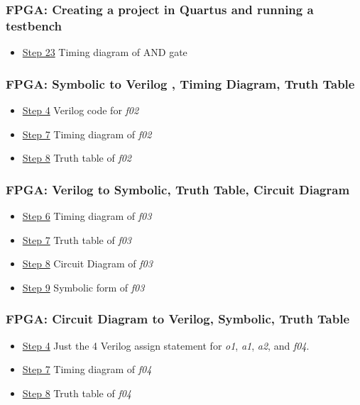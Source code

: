 \subsubsection{FPGA: Creating a project in Quartus and running a testbench}
\begin{itemize}
    \item \protect\hyperlink{Part_1_Step_23}{Step 23} Timing diagram of AND gate
\end{itemize}

\subsubsection{FPGA: Symbolic to Verilog , Timing Diagram, Truth Table}
\begin{itemize}
    \item \protect\hyperlink{Part_2_Step_4}{Step 4} Verilog code for \emph{f02}
    \item \protect\hyperlink{Part_2_Step_7}{Step 7} Timing diagram of \emph{f02}
    \item \protect\hyperlink{Part_2_Step_8}{Step 8} Truth table of \emph{f02}
\end{itemize}

\subsubsection{FPGA: Verilog to Symbolic, Truth Table, Circuit Diagram}
\begin{itemize}
    \item \protect\hyperlink{Part_3_Step_6}{Step 6} Timing diagram of \emph{f03}
    \item \protect\hyperlink{Part_3_Step_7}{Step 7} Truth table of \emph{f03}
    \item \protect\hyperlink{Part_3_Step_8}{Step 8} Circuit    Diagram of \emph{f03}
    \item \protect\hyperlink{Part_3_Step_9}{Step 9} Symbolic form of \emph{f03}
\end{itemize}

\subsubsection{FPGA: Circuit Diagram to Verilog, Symbolic, Truth Table}
\begin{itemize}
    \item \protect\hyperlink{Part_4_Step_4}{Step 4} Just the 4 Verilog assign statement
        for \emph{o1}, \emph{a1}, \emph{a2}, and \emph{f04}.
    \item \protect\hyperlink{Part_4_Step_7}{Step 7} Timing diagram of \emph{f04}
    \item \protect\hyperlink{Part_4_Step_8}{Step 8} Truth table of \emph{f04}
\end{itemize}

